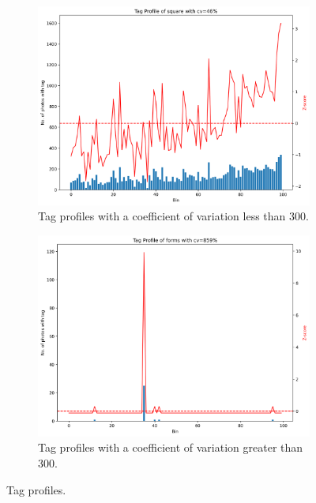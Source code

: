 \documentclass{article}
\theoremstyle{remark}
\begin{document}
\begin{figure}[!h]

\begin{subfigure}{0.5\textwidth}
\includegraphics[width=1\linewidth]{figures/flickr_tags_cv_46.png} 
\caption{Tag profiles with a coefficient of variation less than 300.}
\label{fig:flickr_tags_cv_46}
\end{subfigure}
\begin{subfigure}{0.5\textwidth}
\includegraphics[width=1\linewidth]{figures/flickr_tags_cv_859.png}
\caption{Tag profiles with a coefficient of variation greater than 300.}
\label{fig:flickr_tags_cv_859}
\end{subfigure}

\caption{Tag profiles.} \label{fig:flickr_tags_cv}
\end{figure}
\end{document}
